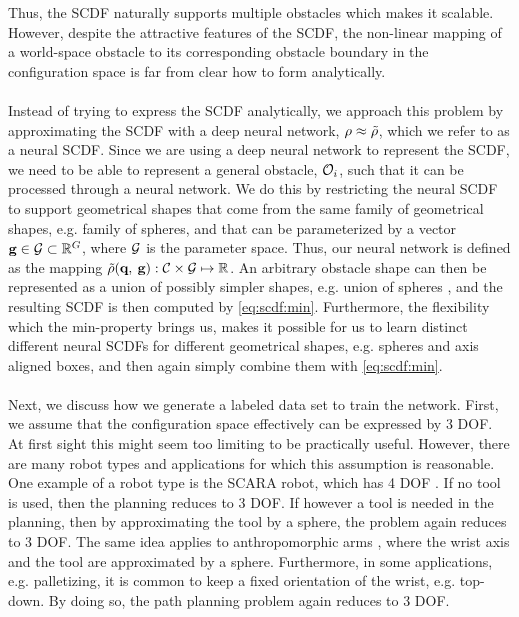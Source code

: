 \documentclass[../main.tex]{subfiles}
\begin{document}
Thus, the SCDF naturally supports multiple obstacles which makes it scalable. However, despite the attractive features of the SCDF, the non-linear mapping of a world-space obstacle to its corresponding obstacle boundary in the configuration space is far from clear how to form analytically. 
\\\\
Instead of trying to express the SCDF analytically, we approach this problem by approximating the SCDF with a deep neural network, $\rho \approx \tilde{\rho}$, which we refer to as a neural SCDF. Since we are using a deep neural network to represent the SCDF, we need to be able to represent a general obstacle, $\mathcal{O}_i$, such that it can be processed through a neural network. We do this by restricting the neural SCDF to support geometrical shapes that come from the same family of geometrical shapes, e.g. family of spheres, and that can be parameterized by a vector $\textbf{g} \in \mathcal{G} \subset \mathbb{R}^G $, where $\mathcal{G}$ is the parameter space. Thus, our neural network is defined as the mapping $\tilde{\rho}(\textbf{q}, \: \textbf{g}) : \mathcal{C} \times \mathcal{G} \mapsto \mathbb{R} $. An arbitrary obstacle shape can then be represented as a union of possibly simpler shapes, e.g. union of spheres \citep{hubbard_spheres}, and the resulting SCDF is then computed by \eqref{eq:scdf:min}. Furthermore, the flexibility which the min-property brings us, makes it possible for us to learn distinct different neural SCDFs for different geometrical shapes, e.g. spheres and axis aligned boxes, and then again simply combine them with \eqref{eq:scdf:min}.
\\\\
Next, we discuss how we generate a labeled data set to train the network. First, we assume that the configuration space effectively can be expressed by 3 DOF. At first sight this might seem too limiting to be practically useful. However, there are many robot types and applications for which this assumption is reasonable. One example of a robot type is the SCARA robot, which has 4 DOF \citep{rob_mod_plan_cont}. If no tool is used, then the planning reduces to 3 DOF. If however a tool is needed in the planning, then by approximating the tool by a sphere, the problem again reduces to 3 DOF. The same idea applies to anthropomorphic arms \citep{rob_mod_plan_cont}, where the wrist axis and the tool are approximated by a sphere. Furthermore, in some applications, e.g. palletizing, it is common to keep a fixed orientation of the wrist, e.g. top-down. By doing so, the path planning problem again reduces to 3 DOF. 
\end{document}
